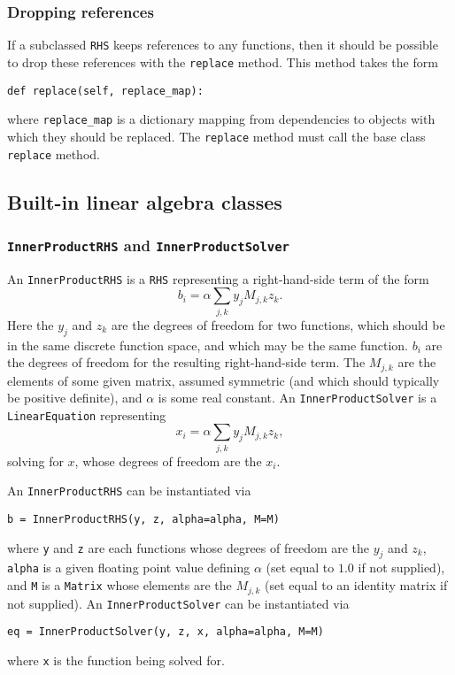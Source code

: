 \documentclass[11pt]{article}
\begin{document}
\subsubsection{Dropping references}

If a subclassed \texttt{RHS} keeps references to any functions, then it should
be possible to drop these references with the \texttt{replace} method. This
method takes the form
\begin{lstlisting}
def replace(self, replace_map):
\end{lstlisting}
where \texttt{replace\_map} is a dictionary mapping from dependencies to
objects with which they should be replaced. The \texttt{replace} method must
call the base class \texttt{replace} method.

\subsection{Built-in linear algebra classes}

\subsubsection{\texttt{InnerProductRHS} and \texttt{InnerProductSolver}}

An \texttt{InnerProductRHS} is a \texttt{RHS} representing a right-hand-side
term of the form
\begin{equation*}
  b_i = \alpha \sum_{j,k} y_j M_{j,k} z_k.
\end{equation*}
Here the $y_j$ and $z_k$ are the degrees of freedom for two functions, which
should be in the same discrete function space, and which may be the same
function. $b_i$ are the degrees of freedom for the resulting right-hand-side
term. The $M_{j,k}$ are the elements of some given matrix, assumed symmetric
(and which should typically be positive definite), and $\alpha$ is some real
constant. An \texttt{InnerProductSolver} is a \texttt{LinearEquation}
representing
\begin{equation*}
  x_i = \alpha \sum_{j,k} y_j M_{j,k} z_k,
\end{equation*}
solving for $x$, whose degrees of freedom are the $x_i$.

An \texttt{InnerProductRHS} can be instantiated via
\begin{lstlisting}
b = InnerProductRHS(y, z, alpha=alpha, M=M)
\end{lstlisting}
where \texttt{y} and \texttt{z} are each functions whose degrees of freedom are
the $y_j$ and $z_k$, \texttt{alpha} is a given floating point value defining
$\alpha$ (set equal to $1.0$ if not supplied), and \texttt{M} is a
\texttt{Matrix} whose elements are the $M_{j,k}$ (set equal to an identity
matrix if not supplied). An \texttt{InnerProductSolver} can be instantiated via
\begin{lstlisting}
eq = InnerProductSolver(y, z, x, alpha=alpha, M=M)
\end{lstlisting}
where \texttt{x} is the function being solved for.
\end{document}

